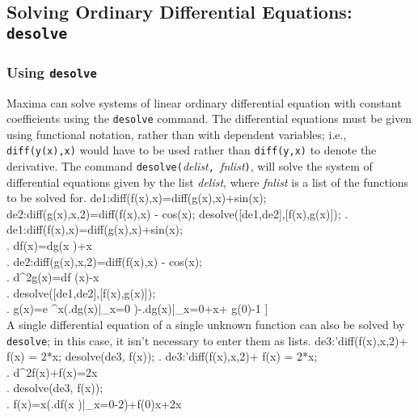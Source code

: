 \documentclass{article}
\begin{document}
\subsection{Solving Ordinary Differential Equations: \texttt{desolve}}
\label{subsec:desolve}

\subsubsection{Using \texttt{desolve}}

Maxima can solve systems of linear ordinary differential equation
with constant coefficients
using the  \texttt{desolve} command. The differential
equations must be given using functional notation, rather than with
dependent variables; i.e., \texttt{diff(y(x),x)} would have to be used
rather than \texttt{diff(y,x)} to denote the derivative.  
The command 
\texttt{desolve(}\textit{delist}\texttt{, }\textit{fnlist}\texttt{)},
will solve the system of differential equations given by the list
\textit{delist}, where \textit{fnlist} is a list of the functions to
be solved for.
\beginmaximasession
de1:diff(f(x),x)=diff(g(x),x)+sin(x);
de2:diff(g(x),x,2)=diff(f(x),x) - cos(x);
desolve([de1,de2],[f(x),g(x)]);
\maximatexsession
{}.  de1:diff(f(x),x)=diff(g(x),x)+sin(x); \\
.   {{d}}\*f\left(x\right)={{d}}\*g\left(x
 \right)+\sin x \\
.  de2:diff(g(x),x,2)=diff(f(x),x) - cos(x); \\
.   {{d^{2}}}\*g\left(x\right)={{d}}\*f
 \left(x\right)-\cos x \\
.  desolve([de1,de2],[f(x),g(x)]); \\
.   \left[ f\left(x\right)=e^{x}\*\left(\left.{{d}\over{d\*x}}\*g
 \left(x\right)\right|_{x=0}\right)-\left.{{d}\over{d\*x}}\*g\left(x
 \right)\right|_{x=0}+f\left(0\right),\linebreak[0]g\left(x\right)=e
 ^{x}\*\left(\left.{{d}}\*g\left(x\right)\right|_{x=0}
 \right)-\left.{{d}}\*g\left(x\right)\right|_{x=0}+\cos x+
 g\left(0\right)-1 \right]  \\
\endmaximasession
\noindent
A single differential equation of a single unknown function can also
be solved by \texttt{desolve}; in this case, it isn't  
necessary to enter them as lists.
\beginmaximasession
de3:'diff(f(x),x,2)+ f(x) = 2*x;
desolve(de3, f(x));
\maximatexsession
{}.  de3:'diff(f(x),x,2)+ f(x) = 2*x; \\
.   {{d^{2}}}\*f\left(x\right)+f\left(x\right)=2\*x \\
.  desolve(de3, f(x)); \\
.   f\left(x\right)=\sin x\*\left(\left.{{d}}\*f\left(x
 \right)\right|_{x=0}-2\right)+f\left(0\right)\*\cos x+2\*x \\
\endmaximasession
\end{document}
